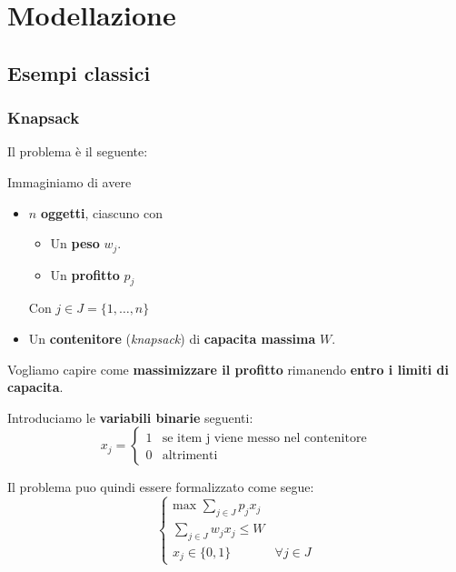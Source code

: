\chapter{Modellazione}

\section{Esempi classici}

\subsection{Knapsack}

Il problema è il seguente:

\begin{exa}[KNAPSACK]
    Immaginiamo di avere
    \begin{itemize}
        \item $n$ \textbf{oggetti}, ciascuno con
            \begin{itemize}
                \item Un \textbf{peso} $w_j$.
                \item Un \textbf{profitto} $p_j$
            \end{itemize}
            Con $j\in J = \{ 1,\ldots ,n \}  $
        \item Un \textbf{contenitore} (\textit{knapsack}) 
            di \textbf{capacita massima} $W$.
    \end{itemize}
    Vogliamo capire come \textbf{massimizzare il profitto} 
    rimanendo \textbf{entro i limiti di capacita}.
\end{exa}

Introduciamo le \textbf{variabili binarie} seguenti:
\[
    x_j = \begin{cases}
        1 & \text{se item j viene messo nel contenitore} \\ 
        0 & \text{altrimenti}
    \end{cases}
\]

Il problema puo quindi essere formalizzato come segue:
\[
    \begin{cases}
        \text{max } \displaystyle\sum_{j \in J} p_{j} x_{j} \\ 
        \sum_{j\in J} w_{j} x_{j} \le W \\ 
        x_{j} \in \{0,1\} & \forall j \in J
    \end{cases}
\]

